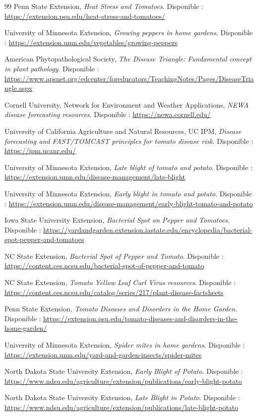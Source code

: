 ﻿\documentclass[11pt,a4paper,openany]{report}
\begin{document}
\begin{thebibliography}{99}
Penn State Extension, \textit{Heat Stress and Tomatoes}. Disponible : \url{https://extension.psu.edu/heat-stress-and-tomatoes/}

University of Minnesota Extension, \textit{Growing peppers in home gardens}. Disponible : \url{https://extension.umn.edu/vegetables/growing-peppers}

American Phytopathological Society, \textit{The Disease Triangle: Fundamental concept in plant pathology}. Disponible : \url{https://www.apsnet.org/edcenter/foreducators/TeachingNotes/Pages/DiseaseTriangle.aspx}

Cornell University, Network for Environment and Weather Applications, \textit{NEWA disease forecasting resources}. Disponible : \url{https://newa.cornell.edu/}

University of California Agriculture and Natural Resources, UC IPM, \textit{Disease forecasting and FAST/TOMCAST principles for tomato disease risk}. Disponible : \url{https://ipm.ucanr.edu/}

University of Minnesota Extension, \textit{Late blight of tomato and potato}. Disponible : \url{https://extension.umn.edu/disease-management/late-blight}

University of Minnesota Extension, \textit{Early blight in tomato and potato}. Disponible : \url{https://extension.umn.edu/disease-management/early-blight-tomato-and-potato}

Iowa State University Extension, \textit{Bacterial Spot on Pepper and Tomatoes}. Disponible : \url{https://yardandgarden.extension.iastate.edu/encyclopedia/bacterial-spot-pepper-and-tomatoes}

NC State Extension, \textit{Bacterial Spot of Pepper and Tomato}. Disponible : \url{https://content.ces.ncsu.edu/bacterial-spot-of-pepper-and-tomato}

NC State Extension, \textit{Tomato Yellow Leaf Curl Virus resources}. Disponible : \url{https://content.ces.ncsu.edu/catalog/series/217/plant-disease-factsheets}

Penn State Extension, \textit{Tomato Diseases and Disorders in the Home Garden}. Disponible : \url{https://extension.psu.edu/tomato-diseases-and-disorders-in-the-home-garden/}

University of Minnesota Extension, \textit{Spider mites in home gardens}. Disponible : \url{https://extension.umn.edu/yard-and-garden-insects/spider-mites}

North Dakota State University Extension, \textit{Early Blight of Potato}. Disponible : \url{https://www.ndsu.edu/agriculture/extension/publications/early-blight-potato}

North Dakota State University Extension, \textit{Late Blight in Potato}. Disponible : \url{https://www.ndsu.edu/agriculture/extension/publications/late-blight-potato}

\end{thebibliography}
\end{document}
